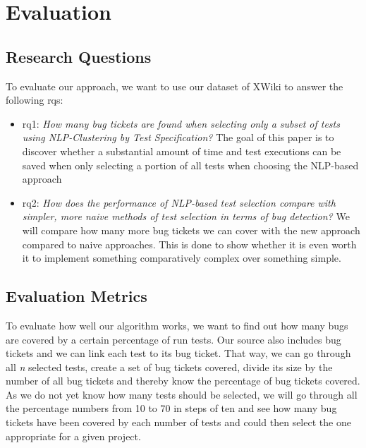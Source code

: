 \section{Evaluation}
\subsection{Research Questions}
To evaluate our approach, we want to use our dataset of XWiki to answer the following \acp{rq}:
\begin{itemize}
    \item \ac{rq}1: \emph{How many bug tickets are found when selecting only a subset of tests using NLP-Clustering by Test Specification?}
    The goal of this paper is to discover whether a substantial amount of time and test executions can be saved when only selecting a portion of all tests when choosing the \ac{NLP}-based approach
    \item \ac{rq}2: \emph{How does the performance of NLP-based test selection compare with simpler, more naive methods of test selection in terms of bug detection?} We will compare how many more bug tickets we can cover with the new approach compared to naive approaches. This is done to show whether it is even worth it to implement something comparatively complex over something simple.
\end{itemize}

\subsection{Evaluation Metrics}
To evaluate how well our algorithm works, we want to find out how many bugs are
covered by a certain percentage of run tests. Our source also includes bug
tickets and we can link each test to its bug ticket. That way, we can go
through all \emph{n} selected tests, create a set of bug tickets covered, divide
its size by the number of all bug tickets and thereby know the percentage of bug
tickets covered. As we do not yet know how many tests should be selected, we
will go through all the percentage numbers from 10 to 70 in steps of ten and
see how many bug tickets have been covered by each number of tests and could then select the one appropriate for a given project.


